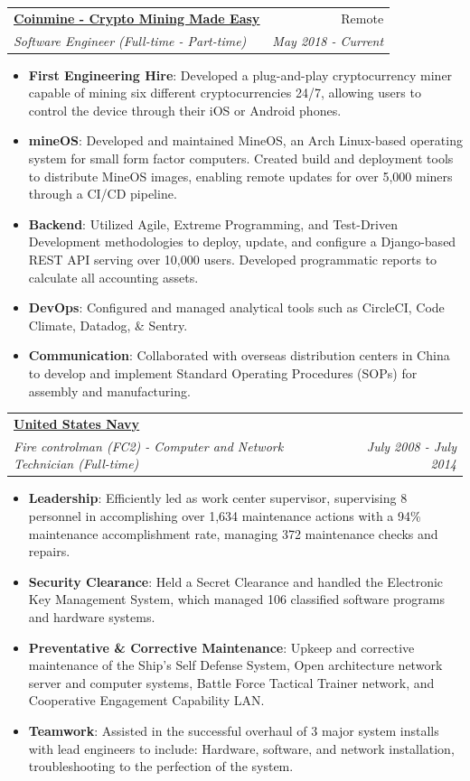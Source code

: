 \documentclass[a4paper,20pt]{article}
\makeatletter
\newcommand{\resumeItem}[2]{
  \item\small{
    \textbf{#1}{: #2 \vspace{-6pt}}
  }
}
\newcommand{\resumeSubheading}[4]{
  \vspace{-1pt}\item
    \begin{tabular*}{0.97\textwidth}{l@{\extracolsep{\fill}}r}
      \textbf{#1} & #2 \\
      \textit{#3} & \textit{#4} \\
    \end{tabular*}\vspace{-5pt}
}
\newcommand{\resumeItemListStart}{\begin{itemize}}
\newcommand{\resumeItemListEnd}{\end{itemize}\vspace{-3pt}}
\makeatother
\begin{document}
    \resumeSubheading
    {\underline{\href{http://coinmine.com}{Coinmine - Crypto Mining Made Easy}}}{Remote}
		{Software Engineer (Full-time - Part-time)}{May 2018 - Current}
		\resumeItemListStart
        \resumeItem{First Engineering Hire}
        {Developed a plug-and-play cryptocurrency miner capable of mining six different cryptocurrencies 24/7, allowing users to control the device through their iOS or Android phones.}
        \resumeItem{mineOS}
        {Developed and maintained MineOS, an Arch Linux-based operating system for small form factor computers. Created build and deployment tools to distribute MineOS images, enabling remote updates for over 5,000 miners through a CI/CD pipeline.}
        \resumeItem{Backend}
        {Utilized Agile, Extreme Programming, and Test-Driven Development methodologies to deploy, update, and configure a Django-based REST API serving over 10,000 users. Developed programmatic reports to calculate all accounting assets.}
        \resumeItem{DevOps}
        {Configured and managed analytical tools such as CircleCI, Code Climate, Datadog, \& Sentry.}
        \resumeItem{Communication}
        {Collaborated with overseas distribution centers in China to develop and implement Standard Operating Procedures (SOPs) for assembly and manufacturing.}
		\resumeItemListEnd

    \resumeSubheading
    {\underline{\href{https://www.navy.mil/}{United States Navy}}}{}
		{Fire controlman (FC2) - Computer and Network Technician (Full-time)}{July 2008 - July 2014}
		\resumeItemListStart
        \resumeItem{Leadership}
        {Efficiently led as work center supervisor, supervising 8 personnel in accomplishing over 1,634 maintenance actions with a 94\% maintenance accomplishment rate, managing 372 maintenance checks and repairs.}
        \resumeItem{Security Clearance}
        {Held a Secret Clearance and handled the Electronic Key Management System, which managed 106 classified software programs and hardware systems.}
        \resumeItem{Preventative \& Corrective Maintenance}
        {Upkeep and corrective maintenance of the Ship's Self Defense System, Open architecture network server and computer systems, Battle Force Tactical Trainer network, and Cooperative Engagement Capability LAN.}
        \resumeItem{Teamwork}
        {Assisted in the successful overhaul of 3 major system installs with lead engineers to include: Hardware, software, and network installation, troubleshooting to the perfection of the system.}
		\resumeItemListEnd
\resumeSubHeadingListEnd
\end{document}
